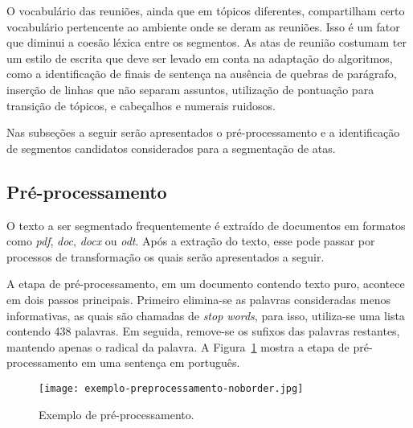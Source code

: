 O vocabulário das reuniões, ainda que em tópicos diferentes, compartilham certo vocabulário pertencente ao ambiente onde se deram as reuniões. Isso é um fator que diminui a coesão léxica entre os segmentos.
As atas de reunião costumam ter um estilo de escrita que deve ser levado em conta na adaptação do algoritmos, como a identificação de finais de sentença na ausência de quebras de parágrafo, inserção de linhas que não separam assuntos, utilização de pontuação para transição de tópicos, e cabeçalhos e numerais ruidosos. 

Nas subseções a seguir serão apresentados o pré-processamento e a identificação de segmentos candidatos considerados para a segmentação de atas.





\subsection{Pré-processamento}
	\label{subsec:preprocessamento}




	O texto a ser segmentado frequentemente é extraído de documentos em formatos como \textit{pdf}, \textit{doc}, \textit{docx} ou \textit{odt}. Após a extração do texto, esse pode passar por processos de transformação os quais serão apresentados a seguir.

	A etapa de pré-processamento, em um documento contendo texto puro, acontece em dois passos principais. Primeiro elimina-se as palavras consideradas menos informativas, as quais são chamadas de \textit{stop words}, para isso, utiliza-se uma lista contendo 438 palavras. Em seguida, remove-se os sufixos das palavras restantes, mantendo apenas o radical da palavra. A Figura~\ref{fig:exemplopreprocessamento} mostra a etapa de pré-processamento em uma sentença em português.
	



  \begin{figure}[!h]
	\centering
	\texttt{[image: exemplo-preprocessamento-noborder.jpg]}
	\caption{Exemplo de pré-processamento.}
	\label{fig:exemplopreprocessamento}
  \end{figure}


